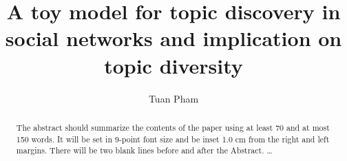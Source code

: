 \documentclass{svproc}
\begin{document}
\mainmatter
\title{A toy model for topic discovery in social networks and implication on topic diversity}


\author{Tuan Pham}




\maketitle

\begin{abstract}
The abstract should summarize the contents of the paper
using at least 70 and at most 150 words. It will be set in 9-point
font size and be inset 1.0 cm from the right and left margins.
There will be two blank lines before and after the Abstract. \dots
{}
\end{abstract}











% 

% 
\end{document}
